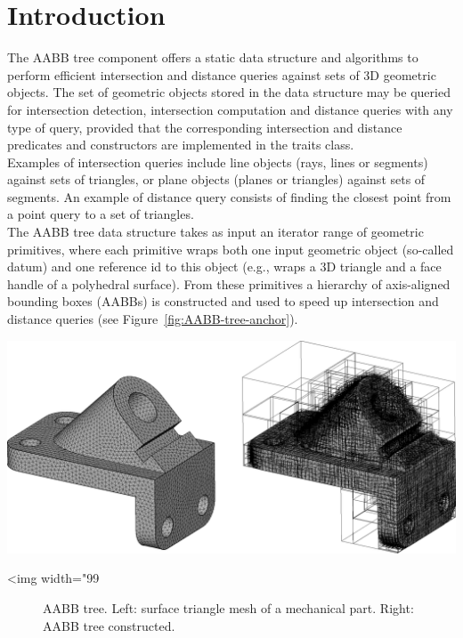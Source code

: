 \section{Introduction}
\label{AABB_tree_section_intro}

The AABB tree component offers a static data structure and algorithms to perform efficient intersection and distance queries against sets of 3D geometric objects.
The set of geometric objects stored in the data structure may be queried for intersection detection, intersection computation and distance queries with any type of query, provided that the corresponding intersection and distance predicates and constructors are implemented in the traits class.\\

Examples of intersection queries include line objects (rays, lines or segments) against sets of triangles, or plane objects (planes or triangles) against sets of segments. An example of distance query consists of finding the closest point from a point query to a set of triangles.\\

The AABB tree data structure takes as input an iterator range of geometric primitives, where each primitive wraps both one input geometric object (so-called datum) and one reference id to this object (e.g., wraps a 3D triangle and a face handle of a polyhedral surface). From these primitives a hierarchy of axis-aligned bounding boxes (AABBs) is constructed and used to speed up intersection and distance queries (see Figure~\ref{fig:AABB-tree-anchor}). 

\begin{center}
    \label{fig:AABB-tree-anchor}
    \begin{ccTexOnly}
      \includegraphics[width=1.0\textwidth]{AABB_tree/anchor}
    \end{ccTexOnly}
    \begin{ccHtmlOnly}
        <img width="99%
    \end{ccHtmlOnly}
    \begin{figure}[h]
        \caption{AABB tree.
                 Left: surface triangle mesh of a mechanical part.
                 Right: AABB tree constructed.}
    \end{figure}
\end{center}
